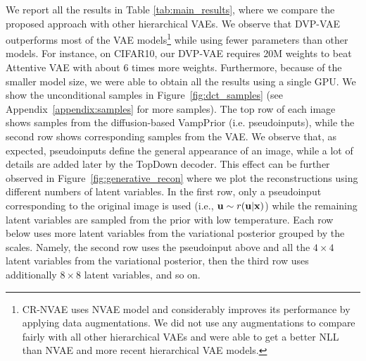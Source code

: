 We report all the results in Table \ref{tab:main_results}, where we compare the proposed approach with other hierarchical VAEs. 
We observe that DVP-VAE outperforms most of the VAE models\footnote{CR-NVAE \citep{sinha2021consistency} uses NVAE model and considerably improves its performance by applying data augmentations. We did not use any augmentations to compare fairly with all other hierarchical VAEs and were able to get a better NLL than NVAE and more recent hierarchical VAE models.
} while using fewer parameters than other models. For instance, on CIFAR10, our DVP-VAE requires 20M weights to beat Attentive VAE with about 6 times more weights.
Furthermore, because of the smaller model size, we were able to obtain all the results using a single GPU. 
We show the unconditional samples in Figure~\ref{fig:dct_samples} (see Appendix~\ref{appendix:samples} for more samples). 
The top row of each image shows samples from the diffusion-based VampPrior (i.e. pseudoinputs), while the second row shows corresponding samples from the VAE. 
We observe that, as expected, pseudoinputs define the general appearance of an image, while a lot of details are added later by the TopDown decoder. 
This effect can be further observed in Figure~\ref{fig:generative_recon} where we plot the reconstructions using different numbers of latent variables. In the first row, only a pseudoinput corresponding to the original image is used (i.e., ${\mathbf{u}} \sim r({\mathbf{u}}|{\mathbf{x}})$) while the remaining latent variables are sampled from the prior with low temperature. Each row below uses more latent variables from the variational posterior grouped by the scales. 
Namely, the second row uses the pseudoinput above and all the $4\times4$ latent variables from the variational posterior, then the third row uses additionally $8\times8$ latent variables, and so on. 

